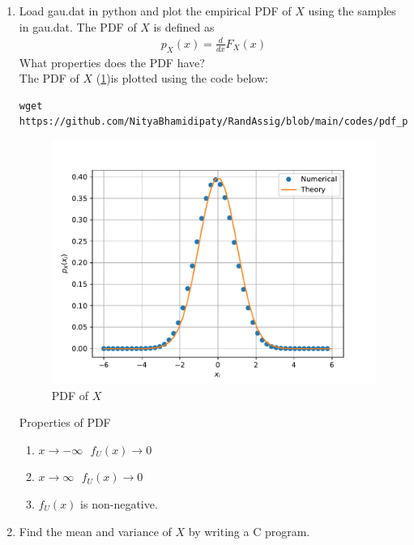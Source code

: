 \documentclass[journal,12pt,twocolumn]{IEEEtran}
\renewcommand\thesection{\arabic{section}}
\begin{document}
\begin{enumerate}[label=\thesection.\arabic*
,ref=\thesection.\theenumi]
\begin{enumerate}
    \item $x\rightarrow{\infty}\text{        } F_U(x) \rightarrow{1}$
    \item $F_U(x)$ is non-decreasing.
    \item $F_U(x)$ is non-negative.
\end{enumerate}
\item
Load gau.dat in python and plot the empirical PDF of $X$ using the samples in gau.dat. The PDF of $X$ is defined as
\begin{align}
p_{X}(x) = \frac{d}{dx}F_{X}(x)
\end{align}
What properties does the PDF have?
\\
\solution The PDF of $X$ (\ref{fig:gau_pdf})is plotted using the code below:
\begin{lstlisting}
wget https://github.com/NityaBhamidipaty/RandAssig/blob/main/codes/pdf_plot.py
\end{lstlisting}
\begin{figure}[h]
    \centering
    \includegraphics[width=\columnwidth]{./figs/gauss_pdf.pdf}
    \caption{PDF of $X$}
    \label{fig:gau_pdf}
\end{figure}
Properties of PDF
\begin{enumerate}
    \item $x\rightarrow{-\infty}\text{        } f_U(x) \rightarrow{0}$
    \item $x\rightarrow{\infty}\text{        } f_U(x) \rightarrow{0}$
    \item $f_U(x)$ is non-negative.
\end{enumerate}
\item Find the mean and variance of $X$ by writing a C program.\\

\end{enumerate}
\end{document}

